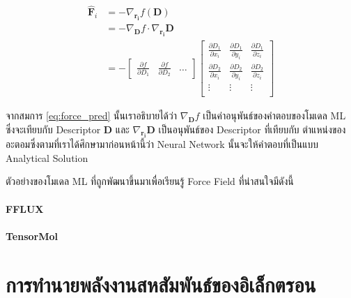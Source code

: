 \begin{align}\label{eq:force_pred}
\hat{\mathbf{F}}_i &= - \nabla_{\mathbf{r_i}} f(\mathbf{D}) \\
&= - \nabla_{\mathbf{D}} f \cdot \nabla_{\mathbf{r_i}} \mathbf{D}\\
&= - \begin{bmatrix}
    \frac{\partial f}{\partial D_1} & \frac{\partial f}{\partial D_2} & \dots
\end{bmatrix}
\begin{bmatrix}
    \frac{\partial D_1}{\partial x_i} & \frac{\partial D_1}{\partial y_i} & \frac{\partial D_1}{\partial z_i}\\
    \frac{\partial D_2}{\partial x_i} & \frac{\partial D_2}{\partial y_i} & \frac{\partial D_2}{\partial z_i}\\
    \vdots & \vdots & \vdots \\
\end{bmatrix}
\end{align}

\noindent จากสมการ \ref{eq:force_pred} นั้นเราอธิบายได้ว่า $\nabla_{\mathbf{D}} f$ เป็นค่าอนุพันธ์ของคำตอบของโมเดล ML 
ซึ่งจะเทียบกับ Descriptor $\mathbf{D}$ และ $\nabla_{\mathbf{r_i}} \mathbf{D}$ เป็นอนุพันธ์ของ Descriptor ที่เทียบกับ%
ตำแหน่งของอะตอมซึ่งตามที่เราได้ศึกษามาก่อนหน้านี้ว่า Neural Network นั้นจะให้คำตอบที่เป็นแบบ Analytical Solution

ตัวอย่างของโมเดล ML ที่ถูกพัฒนาขึ้นมาเพื่อเรียนรู้ Force Field ที่น่าสนใจมีดังนี้

\paragraph{FFLUX}\autocite{hughes2019}

\paragraph{TensorMol}\autocite{yao2018}

\section{การทำนายพลังงานสหสัมพันธ์ของอิเล็กตรอน}
\label{sec:pred_corre_ener}

\autocite{mcdonagh2018,nudejima2019,dick2020,han2021}

